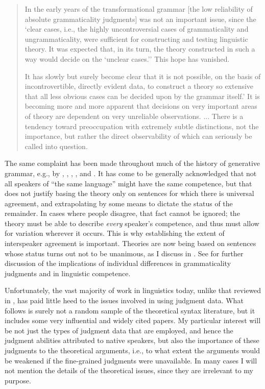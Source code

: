 \begin{quote}
In the early years of the transformational grammar [the low reliability of absolute grammaticality judgments] was not an important issue, since the `clear cases, i.e., the highly uncontroversial cases of grammaticality and ungrammaticality, were sufficient for constructing and testing linguistic theory. It was expected that, in its turn, the theory constructed in such a way would decide on the `unclear cases.'' This hope has vanished. \citep[88]{LeveltEtAl1977}

It has slowly but surely become clear that it is not possible, on the basis of incontrovertible, directly evident data, to construct a theory so extensive that all less obvious cases can be decided upon by the grammar itself.' It is becoming more and more apparent that decisions on very important areas of theory are dependent on very unreliable observations. ... There is a tendency toward preoccupation with extremely subtle distinctions, not the importance, but rather the direct observability of which can seriously be called into question. \citep[vol. 2: 6]{Levelt1974}

\end{quote}

The same complaint has been made throughout much of the history of generative grammar, e.g., by \citet[348]{Bever1970a}, \citet[191]{Labov1972a}, \citet{Langendoen1972}, \citet{Coppieters1987}, and \citet[81]{Birdsong1989}. It has come to be generally acknowledged that not all speakers of ``the same language'' might have the same competence, but that does not justify basing the theory only on sentences for which there is universal agreement, and extrapolating by some means to dictate the status of the remainder. In cases where people disagree, that fact cannot be ignored; the theory must be able to describe \textit{every} speaker's competence, and thus must allow for variation wherever it occurs. This is why establishing the extent of interspeaker agreement is important. Theories are now being based on sentences whose status turns out not to be unanimous, as I discuss in . See 
for further discussion of the implications of individual differences in grammaticality judgments  and in linguistic competence.

Unfortunately, the vast majority of work in linguistics today, unlike that reviewed in , has paid little heed to the issues involved in using judgment data. What follows is surely not a random sample of the theoretical syntax literature, but it includes some very influential and widely cited papers. My particular interest will be not just the types of judgment data that are employed, and hence the judgment abilities attributed to native speakers, but also the importance of these judgments to the theoretical arguments, i.e., to what extent the arguments would be weakened if the fine-grained judgments were  unavailable.  In  many cases I will not mention the details of the theoretical issues, since they are irrelevant to my purpose.
 
